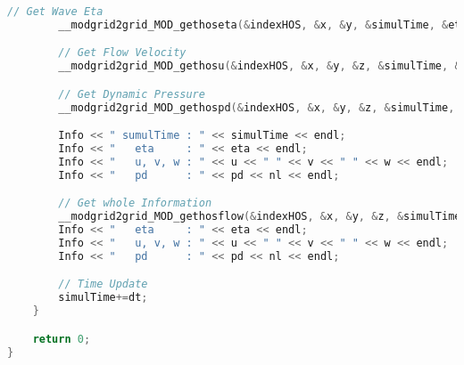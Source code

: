 \begin{lstlisting}[language=c++]
		// Get Wave Eta
		__modgrid2grid_MOD_gethoseta(&indexHOS, &x, &y, &simulTime, &eta);

		// Get Flow Velocity
		__modgrid2grid_MOD_gethosu(&indexHOS, &x, &y, &z, &simulTime, &u, &v, &w);

		// Get Dynamic Pressure
		__modgrid2grid_MOD_gethospd(&indexHOS, &x, &y, &z, &simulTime, &pd);

		Info << " sumulTime : " << simulTime << endl;
		Info << "   eta     : " << eta << endl;
		Info << "   u, v, w : " << u << " " << v << " " << w << endl;
		Info << "   pd      : " << pd << nl << endl;

		// Get whole Information
		__modgrid2grid_MOD_gethosflow(&indexHOS, &x, &y, &z, &simulTime, &eta, &u, &v, &w, &pd);
		Info << "   eta     : " << eta << endl;
		Info << "   u, v, w : " << u << " " << v << " " << w << endl;
		Info << "   pd      : " << pd << nl << endl;

		// Time Update
		simulTime+=dt;
	}

	return 0;
}
		\end{lstlisting}
